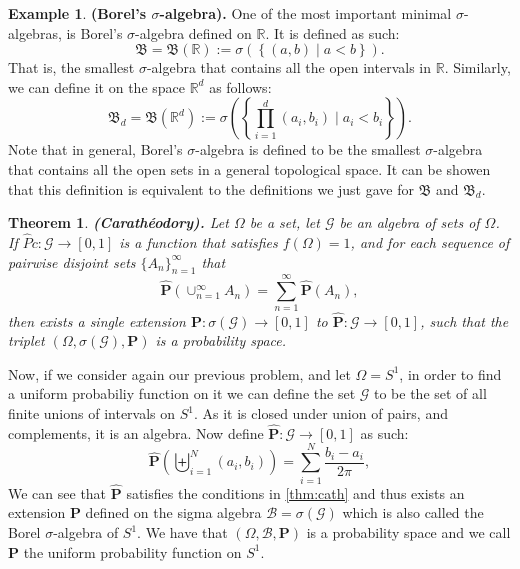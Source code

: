 \documentclass[11pt,a4paper]{article}
\theoremstyle{definition}
\newtheorem{example}{Example}[section]
\theoremstyle{plain}
\newtheorem{theorem}{Theorem}[section]
\newcommand{\R}{\mathbb{R}}
\newcommand{\set}[2]{ \left\{ #1 \mid #2 \right\} }
\renewcommand{\tt}[1]{\textnormal{\textbf{(#1).}}} %
\begin{document}
  \begin{example}
    \tt{Borel's $\sigma$-algebra}
    One of the most important minimal $\sigma$-algebras, is Borel's 
    $\sigma$-algebra defined on $\R$. It is defined as such:
    \[
      \mathfrak B = \mathfrak B(\R) := \sigma(\set{(a,b)}{a < b}).
    \]
    That is, the smallest $\sigma$-algebra that contains all the open 
    intervals in $\R$. Similarly, we can define it on the space $\R^d$
    as follows:
    \[
      \mathfrak B_d = \mathfrak B(\R^d) := 
      \sigma\left(\set{\prod_{i=1}^{d}(a_i,b_i)}{a_i < b_i}\right).
    \]
    Note that in general, Borel's $\sigma$-algebra is defined to be
    the smallest $\sigma$-algebra that contains all the open sets in a
    general topological space. It can be showen that this definition is
    equivalent to the definitions we just gave for $\mathfrak B$ and
    $\mathfrak B_d$.
  \end{example}

  \begin{theorem}\label{thm:cath}
    \tt{Carath\'eodory}
    Let $\Omega$ be a set, let $\mathcal G$ be an algebra of sets of $\Omega$.
    If $\widehat{P} c\colon \mathcal G \to [0,1]$ is a function that satisfies
    $f(\Omega) = 1$, and for each sequence of pairwise disjoint sets
    $\{A_n\}_{n=1}^{\infty}$ that
      \[
        \widehat{\mathbf P} \left(\cup_{n=1}^{\infty}{A_n}\right) = 
        \sum_{n=1}^{\infty}{\widehat{\mathbf P}(A_n)},
      \]
    then exists a single extension 
    $\mathbf P \colon \sigma(\mathcal G) \to [0,1]$ to 
    $\widehat{\mathbf P} \colon \mathcal G \to [0,1]$, such that the triplet
    $(\Omega, \sigma(\mathcal G), \mathbf P)$ is a probability space.
  \end{theorem}

  Now, if we consider again our previous problem, and let $\Omega = S^1$,
  in order to find a uniform probabiliy function on it we can define the
  set $\mathcal G$ to be the set of all finite unions of intervals on $S^1$.
  As it is closed under union of pairs, and complements, it is an algebra.
  Now define $\widehat{\mathbf P} \colon \mathcal G \to [0,1]$ as such:
  \[
    \widehat{\mathbf{P}}\left(\biguplus_{i=1}^{N}\left(a_{i},b_{i}\right)\right)
    = \sum_{i=1}^{N}\frac{b_{i}-a_{i}}{2\pi},
  \]
  We can see that $\widehat{\mathbf P}$ satisfies the conditions in 
  \autoref{thm:cath} and thus exists an extension $\mathbf P$ defined on
  the sigma algebra $\mathcal B = \sigma(\mathcal G)$ which is also called
  the Borel $\sigma$-algebra of $S^1$. We have that 
  $(\Omega, \mathcal B, \mathbf P)$ is a probability space and we call 
  $\mathbf P$ the uniform probability function on $S^1$.
\end{document}
